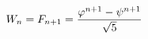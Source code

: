 \documentclass[preview]{standalone}
\begin{document}
\begin{align*}
\special{dvisvgm:raw <g id='unique000'>}W_n = F_{n+1} = \frac{\varphi^{n+1} - \psi^{n+1}}{\sqrt{5}}\special{dvisvgm:raw </g>}
\end{align*}
\end{document}
